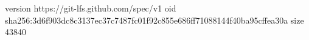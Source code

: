 version https://git-lfs.github.com/spec/v1
oid sha256:3d6f903dc8c3137ec37c7487fc01f92c855e686ff71088144f40ba95cffea30a
size 43840
